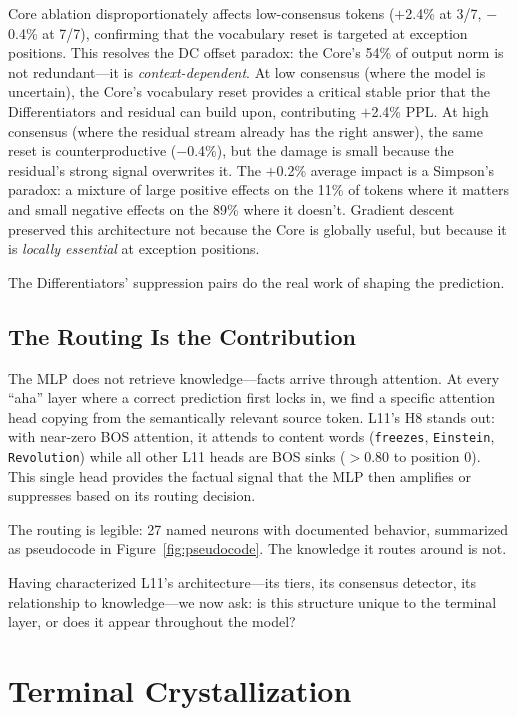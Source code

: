 \documentclass{article}
\begin{document}
Core ablation disproportionately affects low-consensus tokens ($+$2.4\% at
3/7, $-$0.4\% at 7/7), confirming that the vocabulary reset is targeted at
exception positions.
This resolves the DC offset paradox: the Core's 54\% of output norm is not
redundant---it is \emph{context-dependent}.
At low consensus (where the model is uncertain), the Core's vocabulary reset
provides a critical stable prior that the Differentiators and residual can
build upon, contributing $+$2.4\% PPL.
At high consensus (where the residual stream already has the right answer),
the same reset is counterproductive ($-$0.4\%), but the damage is small because
the residual's strong signal overwrites it.
The $+$0.2\% average impact is a Simpson's paradox: a mixture of large
positive effects on the 11\% of tokens where it matters and small negative
effects on the 89\% where it doesn't.
Gradient descent preserved this architecture not because the Core is globally
useful, but because it is \emph{locally essential} at exception positions.

The Differentiators' suppression pairs do the real work of shaping
the prediction.

\subsection{The Routing Is the Contribution}

The MLP does not retrieve knowledge---facts arrive through attention.
At every ``aha'' layer where a correct prediction first locks in, we find
a specific attention head copying from the semantically relevant source token.
L11's H8 stands out: with near-zero BOS attention, it attends to content
words (\texttt{freezes}, \texttt{Einstein}, \texttt{Revolution}) while all
other L11 heads are BOS sinks ($>$0.80 to position 0).
This single head provides the factual signal that the MLP then amplifies or
suppresses based on its routing decision.

The routing is legible: 27 named neurons with documented behavior,
summarized as pseudocode in Figure~\ref{fig:pseudocode}.
The knowledge it routes around is not.

Having characterized L11's architecture---its tiers, its consensus detector,
its relationship to knowledge---we now ask: is this structure unique to the
terminal layer, or does it appear throughout the model?

\section{Terminal Crystallization}
\label{sec:terminal}
\end{document}
